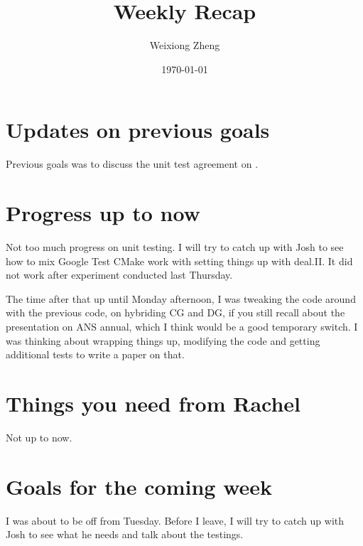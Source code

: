 \documentclass{article}
\title{Weekly Recap} %
\author{Weixiong Zheng} %
\date{\today} %
\begin{document}
\maketitle %

\section{Updates on previous goals}
Previous goals was to discuss the unit test agreement on .

\section{Progress up to now}
Not too much progress on unit testing. I will try to catch up with Josh to see how to mix Google Test CMake work with setting things up with deal.II. It did not work after experiment conducted last Thursday.

The time after that up until Monday afternoon, I was tweaking the code around with the previous code, on hybriding CG and DG, if you still recall about the presentation on ANS annual, which I think would be a good temporary switch. I was thinking about wrapping things up, modifying the code and getting additional tests to write a paper on that.

\section{Things you need from Rachel}
Not up to now.

\section{Goals for the coming week}
I was about to be off from Tuesday. Before I leave, I will try to catch up with Josh to see what he needs and talk about the testings.
\end{document}
